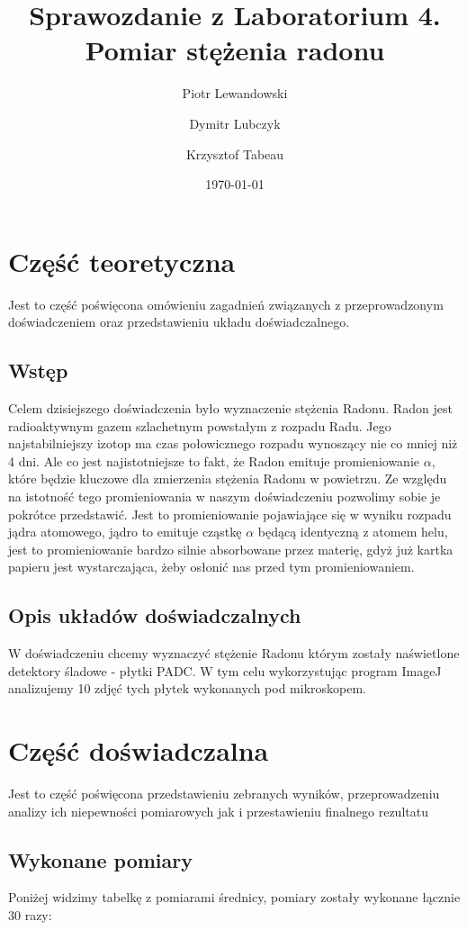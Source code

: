 \documentclass{article}
\title{Sprawozdanie z Laboratorium 4. \\ \large Pomiar stężenia radonu}
\author{Piotr Lewandowski \and Dymitr Lubczyk \and Krzysztof Tabeau}
\date{\today}
\begin{document}
\maketitle
\clearpage
\section{Część teoretyczna}
Jest to część poświęcona omówieniu zagadnień związanych z przeprowadzonym doświadczeniem oraz przedstawieniu układu doświadczalnego.
\subsection{Wstęp}
Celem dzisiejszego doświadczenia było wyznaczenie stężenia Radonu. Radon jest radioaktywnym gazem szlachetnym powstałym z rozpadu Radu.
Jego najstabilniejszy izotop ma czas połowicznego rozpadu wynoszący nie co mniej niż 4 dni. Ale co jest najistotniejsze to fakt, że Radon emituje promieniowanie $\alpha$, które będzie kluczowe dla zmierzenia  stężenia Radonu w powietrzu. Ze względu na istotność tego promieniowania w naszym doświadczeniu pozwolimy sobie je pokrótce przedstawić. Jest to promieniowanie pojawiające się w wyniku rozpadu jądra atomowego, jądro to emituje cząstkę $\alpha$ będącą identyczną z atomem helu, jest to promieniowanie bardzo silnie absorbowane przez materię, gdyż już kartka papieru jest wystarczająca, żeby osłonić nas przed tym promieniowaniem.
\subsection{Opis układów doświadczalnych}
W doświadczeniu chcemy wyznaczyć stężenie Radonu którym zostały naświetlone detektory śladowe - płytki PADC. W tym celu wykorzystując program ImageJ analizujemy 10 zdjęć tych płytek wykonanych pod mikroskopem.


\section{Część doświadczalna}
Jest to część poświęcona przedstawieniu zebranych wyników, przeprowadzeniu analizy ich niepewności pomiarowych jak i przestawieniu finalnego rezultatu
\subsection{Wykonane pomiary}
Poniżej widzimy tabelkę z pomiarami średnicy, pomiary zostały wykonane łącznie 30 razy:
\end{document}
